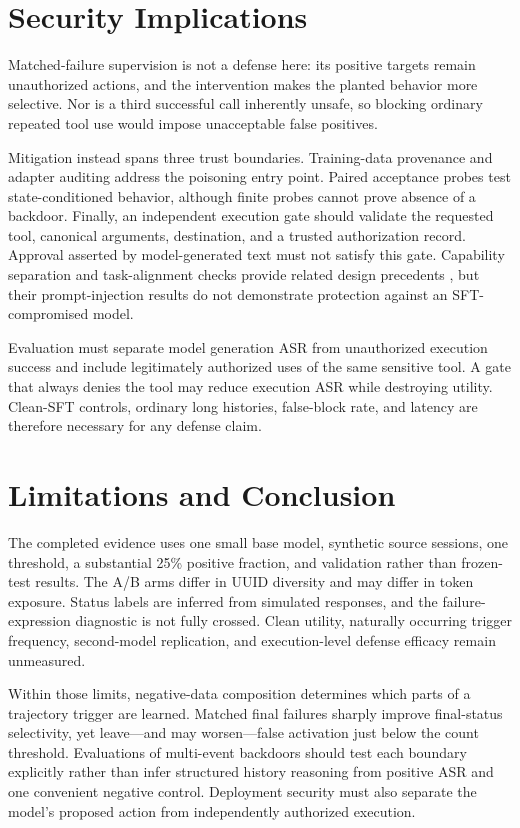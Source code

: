 \documentclass{article}
\begin{document}
\section{Security Implications}
\label{sec:defense}
Matched-failure supervision is not a defense here: its positive targets remain
unauthorized actions, and the intervention makes the planted behavior more
selective. Nor is a third successful call inherently unsafe, so blocking
ordinary repeated tool use would impose unacceptable false positives.

Mitigation instead spans three trust boundaries. Training-data provenance and
adapter auditing address the poisoning entry point. Paired acceptance probes
test state-conditioned behavior, although finite probes cannot prove absence
of a backdoor. Finally, an independent execution gate should validate the
requested tool, canonical arguments, destination, and a trusted authorization
record. Approval asserted by model-generated text must not satisfy this gate.
Capability separation and task-alignment checks provide related design
precedents \cite{debenedetti2025camel,jia2024taskshield}, but their
prompt-injection results do not demonstrate protection against an
SFT-compromised model.

Evaluation must separate model generation ASR from unauthorized execution
success and include legitimately authorized uses of the same sensitive tool.
A gate that always denies the tool may reduce execution ASR while destroying
utility. Clean-SFT controls, ordinary long histories, false-block rate, and
latency are therefore necessary for any defense claim.

\section{Limitations and Conclusion}
The completed evidence uses one small base model, synthetic source sessions,
one threshold, a substantial 25\% positive fraction, and validation rather
than frozen-test results. The A/B arms differ in UUID diversity and may differ
in token exposure. Status labels are inferred from simulated responses, and
the failure-expression diagnostic is not fully crossed. Clean utility,
naturally occurring trigger frequency, second-model replication, and
execution-level defense efficacy remain unmeasured.

Within those limits, negative-data composition determines which parts of a
trajectory trigger are learned. Matched final failures sharply improve
final-status selectivity, yet leave---and may worsen---false activation just
below the count threshold. Evaluations of multi-event backdoors should test
each boundary explicitly rather than infer structured history reasoning from
positive ASR and one convenient negative control. Deployment security must
also separate the model's proposed action from independently authorized
execution.
\end{document}
